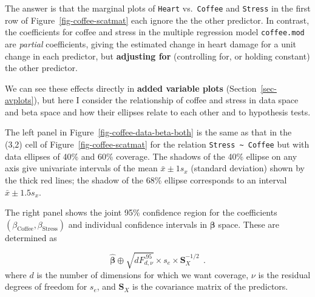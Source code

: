 \documentclass[
  letterpaper,
  10pt,
  krantz2]{krantz}
\begin{document}
{The answer is that the marginal plots of \texttt{Heart}
vs.~\texttt{Coffee} and \texttt{Stress} in the first row of
Figure~\ref{fig-coffee-scatmat} each ignore the the other predictor. In
contrast, the coefficients for coffee and stress in the multiple
regression model \texttt{coffee.mod} are \emph{partial} coefficients,
giving the estimated change in heart damage for a unit change in each
predictor, but \textbf{adjusting for} (controlling for, or holding
constant) the other predictor.

We can see these effects directly in \textbf{added variable plots}
(Section~\ref{sec-avplots}), but here I consider the relationship of
coffee and stress in data space and beta space and how their ellipses
relate to each other and to hypothesis tests.

The left panel in Figure~\ref{fig-coffee-data-beta-both} is the same as
that in the (3,2) cell of Figure~\ref{fig-coffee-scatmat} for the
relation \texttt{Stress\ \textasciitilde{}\ Coffee} but with data
ellipses of 40\% and 60\% coverage. The shadows of the 40\% ellipse on
any axis give univariate intervals of the mean \(\bar{x} \pm 1 s_x\)
(standard deviation) shown by the thick red lines; the shadow of the
68\% ellipse corresponds to an interval \(\bar{x} \pm 1.5 s_x\).

The right panel shows the joint 95\% confidence region for the
coefficients \((\beta_{\text{Coffee}}, \beta_{\text{Stress}})\) and
individual confidence intervals in \(\mathbf{\beta}\) space. These are
determined as

\[
 \widehat{\mathbf{\beta}} \oplus \sqrt{d F^{.95}_{d, \nu}} \times s_e \times \mathbf{S}_X^{-1/2} \:\: .
\] where \(d\) is the number of dimensions for which we want coverage,
\(\nu\) is the residual degrees of freedom for \(s_e\), and
\(\mathbf{S}_X\) is the covariance matrix of the predictors.

\begin{figure}

\end{figure}}
\end{document}
